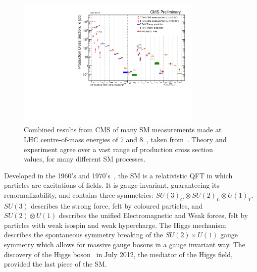 \begin{figure}[htbp]
  \begin{center}
  \includegraphics[width=0.8\textwidth]{Figures/theory/SigmaNew_v0}
  \caption{Combined results from \ac{CMS} of many \ac{SM} measurements made at \ac{LHC} centre-of-mass energies of 7 and 8~\TeV, taken from~\cite{CMSpublictwiki}. Theory and experiment agree over a vast range of production cross section values, for many different \ac{SM} processes.
}
  \label{fig:stairwayToHeaven}
  \end{center}
\end{figure}

Developed in the 1960's and 1970's~\cite{PhysRevLett.19.1264,Glashow:1961tr,Salam:1968rm,Hooft1971167}, the \ac{SM} is a relativistic \ac{QFT} in which particles are excitations of fields. 
It is gauge invariant, guaranteeing its renormalizability, and contains three symmetries:
$SU(3)_{C} \otimes SU(2)_{L} \otimes U(1)_{Y}$.
$SU(3)$ describes the strong force, felt by coloured particles, 
and $SU(2) \otimes U(1)$ describes the unified Electromagnetic and Weak forces, felt by particles with weak isospin and weak hypercharge. 
The Higgs mechanism~\cite{PhysRevLett.13.508} describes the spontaneous symmetry breaking of the $SU(2) \times U(1)$ gauge symmetry which allows for massive gauge bosons in a gauge invariant way.
The discovery of the Higgs boson~\cite{Aad:2012tfa,Chatrchyan:2012ufa} in July 2012, the mediator of the Higgs field, provided the last piece of the \ac{SM}. 


